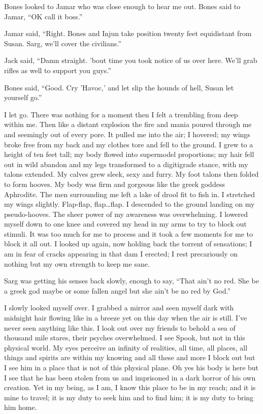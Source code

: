 Bones looked to Jamar who was close enough to hear me out. Bones said to Jamar, ``OK call it boss.''

Jamar said, ``Right. Bones and Injun take position twenty feet equidistant from Susan. Sarg, we'll cover the civilians.''

Jack said, ``Damn straight. 'bout time you took notice of us over here. We'll grab rifles as well to support you guys.''

Bones said, ``Good. Cry 'Havoc,' and let slip the hounds of hell, Susan let yourself go.''


\parasep

I let go. There was nothing for a moment then I felt a trembling from deep within me. Then like a distant explosion the fire and mania poured through me and seemingly out of every pore. It pulled me into the air; I hovered; my wings broke free from my back and my clothes tore and fell to the ground. I grew to a height of ten feet tall; my body flowed into supermodel proportions; my hair fell out in wild abandon and my legs transformed to a digitigrade stance, with my talons extended. My calves grew sleek, sexy and furry. My foot talons then folded to form hooves. My body was firm and gorgeous like the greek goddess Aphrodite. The men surrounding me left a lake of drool fit to fish in. I stretched my wings slightly. Flap-flap, flap\dots flap. I descended to the ground landing on my pseudo-hooves. The sheer power of my awareness was overwhelming. I lowered myself down to one knee and covered my head in my arms to try to block out stimuli. It was too much for me to process and it took a few moments for me to block it all out. I looked up again, now holding back the torrent of sensations; I am in fear of cracks appearing in that dam I erected; I rest precariously on nothing but my own strength to keep me sane.

Sarg was getting his senses back slowly, enough to say, ``That ain't no red. She be a greek god maybe or some fallen angel but she ain't be no red by God.''

I slowly looked myself over. I grabbed a mirror and seen myself dark with midnight hair flowing like in a breeze yet on this day when the air is still. I've never seen anything like this. I look out over my friends to behold a sea of thousand mile stares, their psyches overwhelmed. I see Spook, but not in this physical world. My eyes perceive an infinity of realities, all time, all places, all things and spirits are within my knowing and all these and more I block out but I see him in a place that is not of this physical plane. Oh yes his body is here but I see that he has been stolen from us and imprisoned in a dark horror of his own creation. Yet in my being, as I am, I know this place to be in my reach; and it is mine to travel; it is my duty to seek him and to find him; it is my duty to bring him home.

